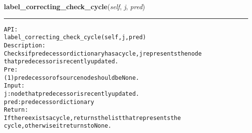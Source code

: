     \label{coinor:gimpy:graph:Graph:label_correcting_check_cycle}

    \vspace{0.5ex}

\hspace{.8\funcindent}\begin{boxedminipage}{\funcwidth}

    \raggedright \textbf{label\_correcting\_check\_cycle}(\textit{self}, \textit{j}, \textit{pred})

    \vspace{-1.5ex}

    \rule{\textwidth}{0.5\fboxrule}
\setlength{\parskip}{2ex}
\begin{alltt}

API:
    label\_correcting\_check\_cycle(self, j, pred)
Description:
    Checks if predecessor dictionary has a cycle, j represents the node
    that predecessor is recently updated.
Pre:
    (1) predecessor of source node should be None.
Input:
    j: node that predecessor is recently updated.
    pred: predecessor dictionary
Return:
    If there exists a cycle, returns the list that represents the
    cycle, otherwise it returns to None.
\end{alltt}

\setlength{\parskip}{1ex}
    \end{boxedminipage}

    \label{coinor:gimpy:graph:Graph:label_correcting_get_cycle}

    \vspace{0.5ex}

